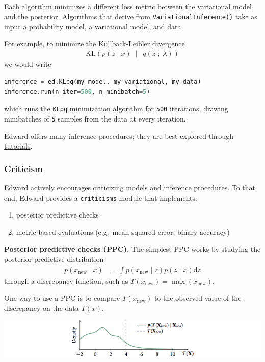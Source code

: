 Each algorithm minimizes a different loss metric between the variational model
and the posterior. Algorithms that derive from \texttt{VariationalInference()}
take as input a probability model, a variational model, and data. 

For example, to minimize the Kullback-Leibler divergence
\begin{align*}
  \text{KL}(p(z \mid x) \;\|\; q(z \;;\; \lambda))
\end{align*}
we would write
\begin{lstlisting}[language=Python]
inference = ed.KLpq(my_model, my_variational, my_data)
inference.run(n_iter=500, n_minibatch=5)
\end{lstlisting}
which runs the \texttt{KLpq} minimization algorithm for \texttt{500} iterations,
drawing minibatches of \texttt{5} samples from the data at every iteration.

Edward offers many inference procedures; they are best explored through 
\href{tutorials.html}{tutorials}.

\subsubsection{Criticism}\label{criticism}

Edward actively encourages criticizing models and inference procedures. To that
end, Edward provides a \texttt{criticisms} module that implements:
\begin{enumerate}
  \item posterior predictive checks
  \item metric-based evaluations (e.g.~mean squared error, binary accuracy)
\end{enumerate}

\textbf{Posterior predictive checks (PPC).}
The simplest PPC works by studying the posterior predictive distribution
\begin{align*}
  p(x_\text{new} \mid x)
  &=
  \int
  p(x_\text{new} \mid z)
  p(z \mid x)
  \text{d} z
\end{align*}
through a discrepancy function, such as $T(x_\text{new}) = \max(x_\text{new})$.

One way to use a PPC is to compare $T(x_\text{new})$ to the observed value
of the discrepancy on the data $T(x)$. 

\includegraphics{images/ppc.png}

